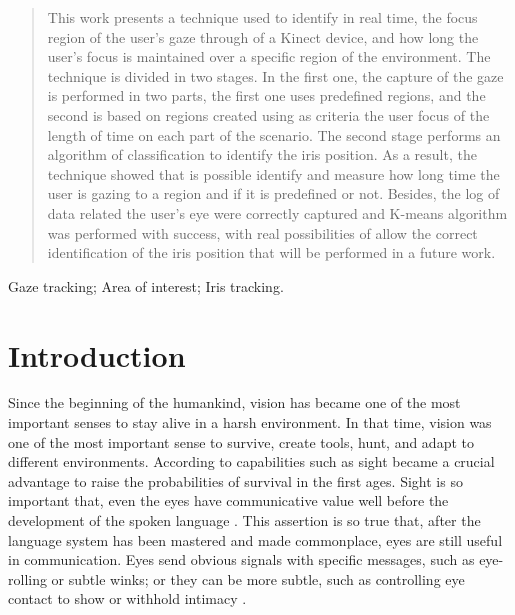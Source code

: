 \documentclass[10pt, conference]{IEEEtran}
\begin{document}
\maketitle

\begin{abstract}
This work presents a technique used to identify in real time, the focus region of the user's gaze through of a Kinect device, and how long the user’s focus is maintained over a specific region of the environment. The technique is divided in two stages. In the first one, the capture of the gaze is performed in two parts, the first one uses predefined regions, and the second is based on regions created using as criteria the user focus of the length of time on each part of the scenario. The second stage performs an algorithm of classification to identify the iris position. As a result, the technique showed that is possible identify and measure how long time the user is gazing to a region and if it is predefined or not. Besides, the log of data related the user's eye were correctly captured and K-means algorithm was performed with success, with real possibilities of allow the correct identification of the iris position that will be performed in a future work.
\end{abstract}

\begin{IEEEkeywords}
	Gaze tracking; Area of interest; Iris tracking.
\end{IEEEkeywords}


\IEEEpeerreviewmaketitle

\section{Introduction}

	Since the beginning of the humankind, vision has became one of the most important senses to stay alive in a harsh environment. 
	In that time, vision was one of the most important sense to survive, create tools, hunt, and adapt to different environments. 
	According to \cite{1} capabilities such as sight became a crucial advantage to raise the probabilities of survival in the first ages.
	Sight is so important that, even the eyes have communicative value well before the development of the spoken language \cite{2}.
	This assertion is so true that, after the language system has been mastered and made commonplace, eyes are still useful in communication. 
	Eyes send obvious signals with specific messages, such as eye-rolling or subtle winks; or they can be more subtle, such as controlling eye contact to show or withhold intimacy \cite{3}.
\end{document}
